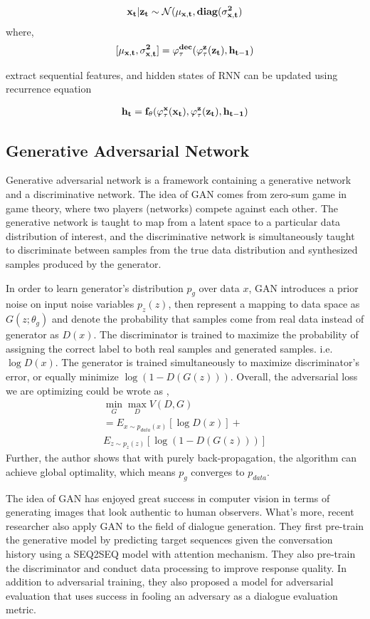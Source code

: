 \documentclass{article}
\begin{document}
$$\bf x_t \bf | z_t \sim \mathcal{N}(\bf \mu _{x,t}, diag(\sigma _{x,t}^2)$$
where,
$$[\bf \mu _{x,t}, \sigma _{x,t}^2] = \varphi^{dec}_{\tau}(\varphi^{\bf z}_{\tau}(\bf z_t),\bf h_{t-1})$$

extract sequential features, and hidden states of RNN can be updated using recurrence equation

\begin{align*}
\bf h_t = f_\theta(\varphi^{\bf x}_\tau (\bf x _t), \varphi^{\bf z}_\tau (\bf z_t), \bf h_{t-1})
\end{align*}

\subsection{Generative Adversarial Network} 

Generative adversarial network \cite{gan} is a framework containing a generative network and a discriminative network. The idea of GAN comes from zero-sum game in game theory, where two players (networks) compete against each other. The generative network is taught to map from a latent space to a particular data distribution of interest, and the discriminative network is simultaneously taught to discriminate between samples from the true data distribution and synthesized samples produced by the generator.

In order to learn generator's distribution $p_g$ over data $x$, GAN introduces a prior noise on input noise variables $p_z(z)$, then represent a mapping to data space as $G(z;\theta_g)$ and denote the probability that samples come from real data instead of generator as $D(x)$. The discriminator is trained to maximize the probability of assigning the correct label to both real samples and generated samples. i.e. $\log D(x)$. The generator is trained simultaneously to maximize discriminator's error, or equally minimize $\log (1-D(G(z)))$. Overall, the adversarial loss we are optimizing could be wrote as ,
\begin{align*}
\min_G \max_D V(D,G) \\
= E_{x\sim p_{data}(x)}[\log D(x)] +\\
E_{z\sim p_z(z)}[\log (1-D(G(z)))]
\end{align*}
Further, the author shows that with purely back-propagation, the algorithm can achieve global optimality, which means $p_g$ converges to $p_{data}$.

The idea of GAN has enjoyed great success in computer vision in terms of generating images that look authentic to human observers. What's more, recent researcher also apply GAN to the field of dialogue generation. They first pre-train the generative model by predicting target sequences given the conversation history using a SEQ2SEQ model with attention mechanism. They also pre-train the discriminator and conduct data processing to improve response quality. In addition to adversarial training, they also proposed a model for adversarial evaluation that uses success in fooling an adversary as a dialogue evaluation metric.
\end{document}
